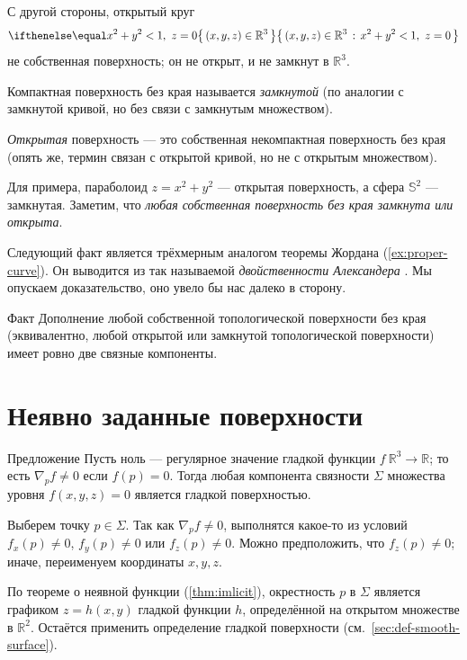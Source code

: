 С другой стороны, открытый круг 
\[\set{(x,y,z)\in\mathbb{R}^3}{x^2+y^2<1,\  z=0}\]
не собственная поверхность; он не открыт, и не замкнут в $\mathbb{R}^3$.

{\sloppy

Компактная поверхность без края называется \emph{замкнутой}
(по аналогии с замкнутой кривой, но без связи с замкнутым множеством).

}

\emph{Открытая} поверхность --- это
собственная некомпактная поверхность без края 
(опять же, термин связан с открытой кривой, но не с открытым множеством).

Для примера, параболоид $z=x^2+y^2$ --- открытая поверхность,
а сфера $\mathbb{S}^2$ --- замкнутая.
Заметим, что \textit{любая собственная поверхность без края замкнута или открыта}.

{\sloppy

Следующий факт является трёхмерным аналогом теоремы Жордана (\ref{ex:proper-curve}).
Он выводится из так называемой {}\emph{двойственности Александера} \cite{hatcher}.
Мы опускаем доказательство, оно увело бы нас далеко в сторону.

}

\begin{thm}{Факт}\label{clm:proper-divides}
Дополнение любой собственной топологической поверхности без края (эквивалентно, любой открытой или замкнутой топологической поверхности) имеет ровно две связные компоненты.
\end{thm}


\section{Неявно заданные поверхности}

\begin{thm}{Предложение}\label{prop:implicit-surface}
Пусть ноль --- регулярное значение гладкой функции $f\:\mathbb{R}^3\to \mathbb{R}$;
то есть $\nabla_p f\ne 0$ если $f(p)=0$.
Тогда любая компонента связности $\Sigma$ множества уровня $f(x,y,z)=0$ является гладкой поверхностью.
\end{thm}

Выберем точку $p\in\Sigma$.
Так как $\nabla_p f\ne 0$, выполнятся какое-то из условий 
$f_x(p)\ne 0$,
$f_y(p)\ne 0$ или
$f_z(p)\ne 0$.
Можно предположить, что $f_z(p)\ne 0$;
иначе, переименуем координаты $x,y,z$.

По теореме о неявной функции (\ref{thm:imlicit}), окрестность $p$ в $\Sigma$ является графиком $z=h(x,y)$ гладкой функции $h$, определённой на открытом множестве в $\mathbb{R}^2$.
Остаётся применить определение гладкой поверхности (см.~\ref{sec:def-smooth-surface}).
\qeds

